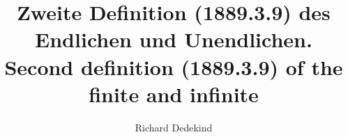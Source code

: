 \documentclass[leqno,hidelinks,10pt]{article}
\theoremstyle{definition}
\begin{document}
\hypersetup{pageanchor=false}





{}

\title{Zweite Definition (1889.3.9) des Endlichen und Unendlichen.\\
{\normalsize Second definition (1889.3.9) of the finite and infinite}}
\author{Richard Dedekind}
\date{}

\maketitle

\end{document}
